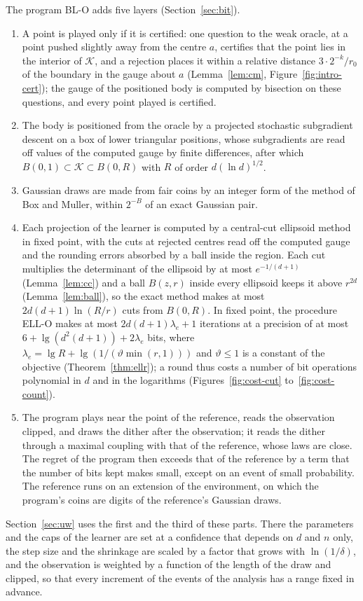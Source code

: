 \documentclass[11pt]{amsart}
\theoremstyle{definition}
\numberwithin{equation}{section}
\newcommand{\cK}{\mathcal{K}}
\begin{document}
The program BL-O adds five layers (Section~\ref{sec:bit}).
\begin{enumerate}[label=(\arabic*),resume]
\item A point is played only if it is certified: one question to the weak oracle, at a point pushed slightly away from the centre $a$, certifies that the point lies in the interior of $\cK$, and a rejection places it within a relative distance $3\cdot2^{-k}/r_0$ of the boundary in the gauge about $a$ (Lemma~\ref{lem:cm}, Figure~\ref{fig:intro-cert}); the gauge of the positioned body is computed by bisection on these questions, and every point played is certified.
\item The body is positioned from the oracle by a projected stochastic subgradient descent on a box of lower triangular positions, whose subgradients are read off values of the computed gauge by finite differences, after which $B(0,1)\subset\cK\subset B(0,R)$ with $R$ of order $d(\ln d)^{1/2}$.
\item Gaussian draws are made from fair coins by an integer form of the method of Box and Muller, within $2^{-B}$ of an exact Gaussian pair.
\item Each projection of the learner is computed by a central-cut ellipsoid method in fixed point, with the cuts at rejected centres read off the computed gauge and the rounding errors absorbed by a ball inside the region. Each cut multiplies the determinant of the ellipsoid by at most $e^{-1/(d+1)}$ (Lemma~\ref{lem:cc}) and a ball $B(z,r)$ inside every ellipsoid keeps it above $r^{2d}$ (Lemma~\ref{lem:ball}), so the exact method makes at most $2d(d+1)\ln(R/r)$ cuts from $B(0,R)$. In fixed point, the procedure ELL-O makes at most $2d(d+1)\lambda_e+1$ iterations at a precision of at most $6+\lg(d^2(d+1))+2\lambda_e$ bits, where $\lambda_e=\lg R+\lg(1/(\vartheta\min(r,1)))$ and $\vartheta\le1$ is a constant of the objective (Theorem~\ref{thm:ellr}); a round thus costs a number of bit operations polynomial in $d$ and in the logarithms (Figures~\ref{fig:cost-cut} to~\ref{fig:cost-count}).
\item The program plays near the point of the reference, reads the observation clipped, and draws the dither after the observation; it reads the dither through a maximal coupling with that of the reference, whose laws are close. The regret of the program then exceeds that of the reference by a term that the number of bits kept makes small, except on an event of small probability. The reference runs on an extension of the environment, on which the program's coins are digits of the reference's Gaussian draws.
\end{enumerate}
Section~\ref{sec:uw} uses the first and the third of these parts. There the parameters and the caps of the learner are set at a confidence that depends on $d$ and $n$ only, the step size and the shrinkage are scaled by a factor that grows with $\ln(1/\delta)$, and the observation is weighted by a function of the length of the draw and clipped, so that every increment of the events of the analysis has a range fixed in advance.
\end{document}
